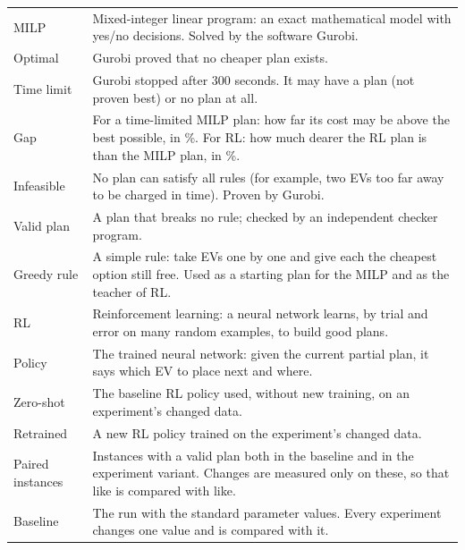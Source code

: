 {\begin{longtable}{@{}>{\raggedright\arraybackslash}p{3.6cm}>{\raggedright\arraybackslash}p{12.6cm}@{}}
MILP & Mixed-integer linear program: an exact mathematical model with yes/no decisions. Solved by the software Gurobi. \\
Optimal & Gurobi proved that no cheaper plan exists. \\
Time limit & Gurobi stopped after 300 seconds. It may have a plan (not proven best) or no plan at all. \\
Gap & For a time-limited MILP plan: how far its cost may be above the best possible, in \%. For RL: how much dearer the RL plan is than the MILP plan, in \%. \\
Infeasible & No plan can satisfy all rules (for example, two EVs too far away to be charged in time). Proven by Gurobi. \\
Valid plan & A plan that breaks no rule; checked by an independent checker program. \\
Greedy rule & A simple rule: take EVs one by one and give each the cheapest option still free. Used as a starting plan for the MILP and as the teacher of RL. \\
RL & Reinforcement learning: a neural network learns, by trial and error on many random examples, to build good plans. \\
Policy & The trained neural network: given the current partial plan, it says which EV to place next and where. \\
Zero-shot & The baseline RL policy used, without new training, on an experiment's changed data. \\
Retrained & A new RL policy trained on the experiment's changed data. \\
Paired instances & Instances with a valid plan both in the baseline and in the experiment variant. Changes are measured only on these, so that like is compared with like. \\
Baseline & The run with the standard parameter values. Every experiment changes one value and is compared with it. \\
\bottomrule
\end{longtable}}
